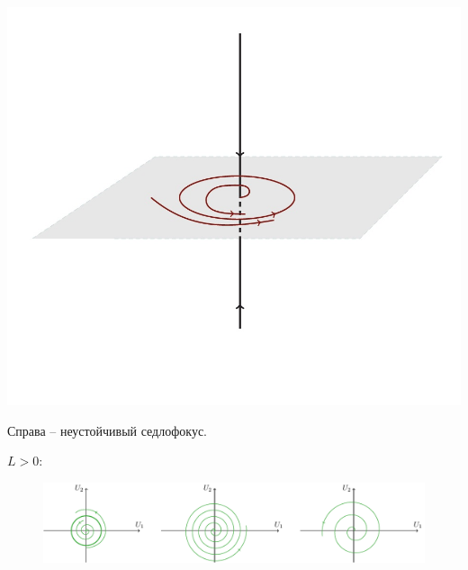 \begin{center}
\begin{minipage}{0.3\linewidth}
        \vspace{-50pt}
        \label{fig:1}
    \end{minipage}
\hfill     
    \begin{minipage}{0.3\linewidth}
        \includegraphics[width=\linewidth]{fig/55_3.jpg} 
        \vspace{-50pt}
        \label{fig:1}
    \end{minipage}    
\end{center}

Справа -- неустойчивый седлофокус.

$L>0:$
\begin{figure}[H]
	\centering
	\includegraphics[width=1\linewidth]{fig/fig58.pdf}   
\end{figure}

